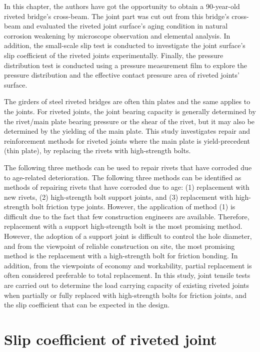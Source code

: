 In this chapter, the authors have got the opportunity to obtain a 90-year-old riveted bridge's cross-beam. The joint part was cut out from this bridge's cross-beam and evaluated the riveted joint surface's aging condition in natural corrosion weakening by microscope observation and elemental analysis. In addition, the small-scale slip test is conducted to investigate the joint surface's slip coefficient of the riveted joints experimentally. Finally, the pressure distribution test is conducted using a pressure measurement film to explore the pressure distribution and the effective contact pressure area of riveted joints' surface.

The girders of steel riveted bridges are often thin plates and the same applies to the joints. For riveted joints, the joint bearing capacity is generally determined by the rivet/main plate bearing pressure or the shear of the rivet, but it may also be determined by the yielding of the main plate. This study investigates repair and reinforcement methods for riveted joints where the main plate is yield-precedent (thin plate), by replacing the rivets with high-strength bolts.

The following three methods can be used to repair rivets that have corroded due to age-related deterioration. The following three methods can be identified as methods of repairing rivets that have corroded due to age: (1) replacement with new rivets, (2) high-strength bolt support joints, and (3) replacement with high-strength bolt friction type joints. However, the application of method (1) is difficult due to the fact that few construction engineers are available. Therefore, replacement with a support high-strength bolt is the most promising method. However, the adoption of a support joint is difficult to control the hole diameter, and from the viewpoint of reliable construction on site, the most promising method is the replacement with a high-strength bolt for friction bonding. In addition, from the viewpoints of economy and workability, partial replacement is often considered preferable to total replacement. In this study, joint tensile tests are carried out to determine the load carrying capacity of existing riveted joints when partially or fully replaced with high-strength bolts for friction joints, and the slip coefficient that can be expected in the design.


\section{Slip coefficient of riveted joint}



